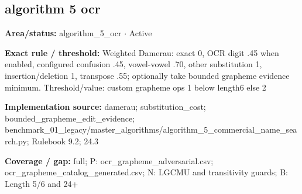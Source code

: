 \subsection*{algorithm 5 ocr}
\begin{tcolorbox}[enhanced,breakable,colback=white,colframe=Muted!45,boxrule=0.45pt,arc=1.5pt,left=6pt,right=6pt,top=5pt,bottom=5pt,title={\texttt{A5-WEIGHTED-DAMERAU-10}},title after break={\texttt{A5-WEIGHTED-DAMERAU-10}\ (continued)},fonttitle=\headingfont\bfseries\color{Navy},coltitle=Navy]
\textbf{Area/status:} algorithm\_\allowbreak{}5\_\allowbreak{}ocr $\boldsymbol{\cdot}$ Active\par
\smallskip
\textbf{Exact rule / threshold:} Weighted Damerau: exact 0, OCR digit .45 when enabled, configured confusion .45, vowel-vowel .70, other substitution 1, insertion/\allowbreak{}deletion 1, transpose .55; optionally take bounded grapheme evidence minimum. Threshold/\allowbreak{}value: custom grapheme ops 1 below length6 else 2\par
\smallskip
\textbf{Implementation source:} damerau; substitution\_\allowbreak{}cost; bounded\_\allowbreak{}grapheme\_\allowbreak{}edit\_\allowbreak{}evidence; benchmark\_\allowbreak{}01\_\allowbreak{}legacy/\allowbreak{}master\_\allowbreak{}algorithms/\allowbreak{}algorithm\_\allowbreak{}5\_\allowbreak{}commercial\_\allowbreak{}name\_\allowbreak{}search.py; Rulebook 9.2; 24.3\par
\smallskip
\textbf{Coverage / gap:} full; P: ocr\_\allowbreak{}grapheme\_\allowbreak{}adversarial.csv; ocr\_\allowbreak{}grapheme\_\allowbreak{}catalog\_\allowbreak{}generated.csv; N: LGCMU and transitivity guards; B: Length 5/\allowbreak{}6 and 24+
\end{tcolorbox}
\medskip
